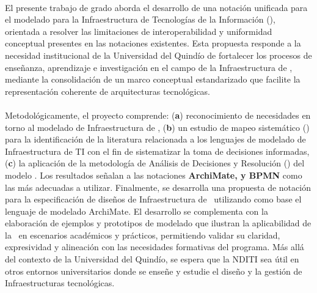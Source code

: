 \label{cap:resumen}
\mbox{}\\
\noindent
El presente trabajo de grado aborda el desarrollo de una notación unificada para el modelado para la Infraestructura de Tecnologías de la Información (\NDITI), orientada a resolver las limitaciones de interoperabilidad y uniformidad conceptual presentes en las notaciones existentes. Esta propuesta responde a la necesidad institucional de la Universidad del Quindío de fortalecer los procesos de enseñanza, aprendizaje e investigación en el campo de la Infraestructura de \TI{}, mediante la consolidación de un marco conceptual estandarizado que facilite la representación coherente de arquitecturas tecnológicas.
\\\\
Metodológicamente, el proyecto comprende: (\textbf{a}) reconocimiento de necesidades en torno al modelado de Infraestructura de \TI{}, (\textbf{b}) un estudio de mapeo sistemático (\SMS) para la identificación de la literatura relacionada a los lenguajes de modelado de Infraestructura de TI con el fin de sistematizar la toma de decisiones informadas, (\textbf{c}) la aplicación de la metodología de Análisis de Decisiones y Resolución (\DAR) del modelo \CMMI. Los resultados señalan a las notaciones \textbf{ArchiMate, \UML{} y BPMN} como las más adecuadas a utilizar. Finalmente, se desarrolla una propuesta de notación para la especificación de diseños de Infraestructura de \TI~utilizando como base el lenguaje de modelado ArchiMate.  El desarrollo se complementa con la elaboración de ejemplos y prototipos de modelado que ilustran la aplicabilidad de la \NDITI~en escenarios académicos y prácticos, permitiendo validar su claridad, expresividad y alineación con las necesidades formativas del programa. Más allá del contexto de la Universidad del Quindío, se espera que la NDITI sea útil en otros entornos universitarios donde se enseñe y estudie el diseño y la gestión de Infraestructuras tecnológicas.





